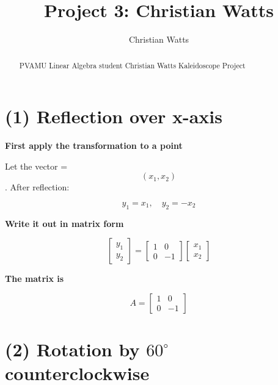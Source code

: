 \documentclass{ximera}
\title{Project 3: Christian Watts}
\author{Christian Watts}
\begin{document}
\begin{abstract}
        PVAMU Linear Algebra student Christian Watts Kaleidoscope Project
\end{abstract}
\maketitle











\section*{(1) Reflection over x-axis}

\textbf{First apply the transformation to a point}

Let the vector = $$(x_1, x_2)$$. After reflection:

\[
y_1 = x_1, \quad y_2 = -x_2
\]

\textbf{Write it out in matrix form}

\[
\begin{bmatrix}
y_1 \\
y_2
\end{bmatrix}
=
\begin{bmatrix}
1 & 0 \\
0 & -1
\end{bmatrix}
\begin{bmatrix}
x_1 \\
x_2
\end{bmatrix}
\]

\textbf{The matrix is}

\[
A =
\begin{bmatrix}
1 & 0 \\
0 & -1
\end{bmatrix}
\]

\section*{(2) Rotation by $60^\circ$ counterclockwise}
\end{document}
